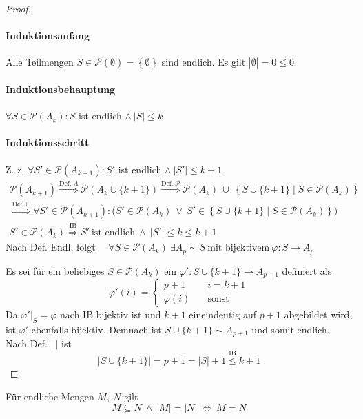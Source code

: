 \documentclass[a4paper, 12pt]{scrartcl}
\newcommand{\defimpl}[1]{\stackrel{\text{Def.}\;#1}{\Longrightarrow}}
\newcommand{\txtimpl}[1]{\stackrel{\text{#1}}{\Longrightarrow}}
\begin{document}
\begin{proof}\ \vspace{-1em}
\paragraph*{Induktionsanfang} Alle Teilmengen $S \in \mathcal{P}(\emptyset) = \left\{ \emptyset \right\}$ sind endlich. Es gilt $|\emptyset| = 0 \leq 0$
\paragraph*{Induktionsbehauptung} $\forall S \in \mathcal{P}(A_k):S$ ist endlich $\wedge\: |S| \leq k$
\paragraph*{Induktionsschritt} Z. z. $\forall S' \in \mathcal{P}(A_{k+1}): S'$ ist endlich $\wedge\: |S'| \leq k+1$
\begin{gather*}
	\mathcal{P}(A_{k+1}) \defimpl{A} \mathcal{P}\left( A_k \cup \{k+1\} \right)
	\defimpl{\mathcal{P}} \mathcal{P}(A_k) \:\cup\: \left\{ S \cup \{k+1\} \mid S \in \mathcal{P}(A_k) \right\} \\
	\defimpl{\cup} \forall S' \in \mathcal{P}(A_{k+1}): \big( S' \in \mathcal{P}(A_k) \ \vee\ S' \in \left\{ S \cup \{k+1\} \mid S \in \mathcal{P}(A_k) \right\} \big) \\
	S' \in \mathcal{P}(A_k) \txtimpl{IB} S'\ \text{ist endlich}\:\wedge\: |S'| \leq k \leq k+1
\end{gather*}
Nach Def. Endl. folgt $\quad\forall S \in \mathcal{P}(A_k)\ \exists A_p \sim S\ \text{mit bijektivem}\ \varphi:S \rightarrow A_p$

Es sei für ein beliebiges $S \in \mathcal{P}(A_k)$ ein $\varphi': S \cup \{k+1\} \rightarrow A_{p+1}$ definiert als
\[ \varphi'(i) = \begin{cases}
	{p+1} &\quad i = k + 1 \\
	\varphi(i) &\quad \text{sonst}
\end{cases} \]
Da $\varphi'\rvert_S = \varphi$ nach IB bijektiv ist und $k+1$ eineindeutig auf $p+1$ abgebildet wird, ist $\varphi'$ ebenfalls bijektiv. Demnach ist $S \cup \{k+1\} \sim A_{p+1}$ und somit endlich. Nach Def. $|\ |$ ist
\[ \left\lvert S \cup \{k+1\} \right\rvert = p+1 = |S|+1 \stackrel{\text{IB}}{\leq} k+1 \]
\end{proof}
\newpage
\begin{theorem}
Für endliche Mengen $M,\ N$ gilt
\[ M \subseteq N \:\wedge\: |M| = |N| \ \Leftrightarrow\ M = N \]
\end{theorem}
\end{document}
